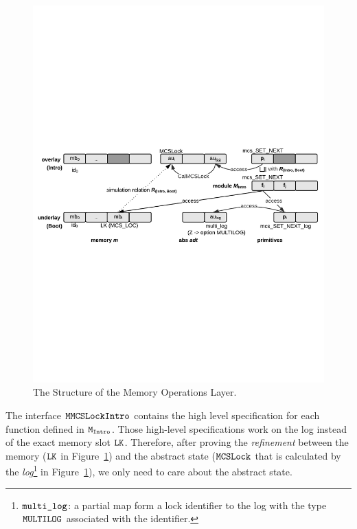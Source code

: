 \begin{figure}
\begin{center}
\includegraphics[width=\linewidth]{figs/mcslock/getsetrefinement}
\end{center}
\caption{The Structure of the Memory Operations Layer.}
\label{fig:chapter:mcslock:layer-struct-mcs-verification}
\end{figure}

The interface ${\mathrm{\texttt{MMCSLockIntro}}}$ contains the high level specification for each function defined in ${\mathrm{\texttt{M}}}_ {{\mathrm{\texttt{Intro}}}}$. 
Those high-level specifications work on the log instead of the exact memory slot ${\mathrm{\texttt{LK}}}$.
Therefore, after proving the {\em refinement} between the memory (${\mathrm{\texttt{LK}}}$ in Figure~\ref{fig:chapter:mcslock:layer-struct-mcs-verification})
and the abstract state (${\mathrm{\texttt{MCSLock}}}$ that is calculated by the \emph{log}\footnote{${\mathrm{\texttt{multi\_log}}}$: a partial map form a lock identifier to the log with the type ${\mathrm{\texttt{MULTILOG}}}$ associated with the identifier.}
in Figure~\ref{fig:chapter:mcslock:layer-struct-mcs-verification}), we only need to care about the abstract state.

